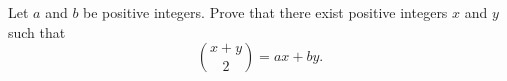 Let $ a$ and $b$ be positive integers. Prove that there exist positive integers $ x $ and $ y $ such that\[ \binom{x+y}{2} = ax + by . \]